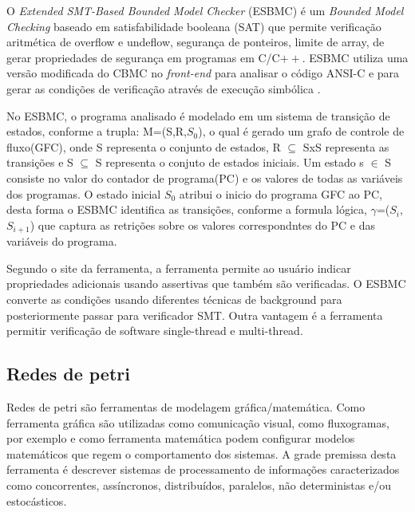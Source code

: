 \par
O \textit{Extended SMT-Based Bounded Model Checker} (ESBMC) é um \textit{Bounded Model Checking} baseado em satisfabilidade booleana (SAT) que permite verificação aritmética de overflow e undeflow, segurança de ponteiros, limite de array, de gerar propriedades de segurança em programas em C/C$++$. ESBMC utiliza uma versão modificada do CBMC no \textit{front-end} para analisar o código ANSI-C e para gerar as condições de verificação através de execução simbólica \cite{cordeiro2012smt,rocha2015verificaccao}.

\par
No ESBMC, o programa analisado é modelado em um sistema de transição de estados, conforme a trupla: M=(S,R,$S_{0}$), o qual é gerado um grafo de controle de fluxo(GFC), onde S representa o conjunto de estados, R $\subseteq$ SxS representa as transições e S $\subseteq$ S representa o conjuto de estados iniciais. Um estado s $\in$ S consiste no valor do contador de programa(PC) e os valores de todas as variáveis dos programas. O estado inicial $S_{0}$ atribui o inicio do programa GFC ao PC, desta forma o ESBMC identifica as transições, conforme a formula lógica, $\gamma$=($S_{i}$,$S_{i+1}$) que captura as retrições sobre os valores correspondntes do PC e das variáveis do programa\cite{cordeiro2012smt}.

\par
Segundo o site da ferramenta, a ferramenta permite ao usuário indicar propriedades adicionais usando assertivas que também são verificadas. O ESBMC converte as condições usando diferentes técnicas de background para posteriormente passar para verificador SMT. Outra vantagem é a ferramenta permitir verificação de software single-thread e multi-thread.

\subsection{Redes de petri}
Redes de petri são ferramentas de modelagem gráfica/matemática. Como ferramenta gráfica são utilizadas como comunicação visual, como fluxogramas, por exemplo e como ferramenta matemática podem configurar modelos matemáticos que regem o comportamento dos sistemas. A grade premissa desta ferramenta é descrever sistemas de processamento de informações caracterizados como concorrentes, assíncronos, distribuídos, paralelos, não deterministas e/ou estocásticos\cite{murata1989petri}.

